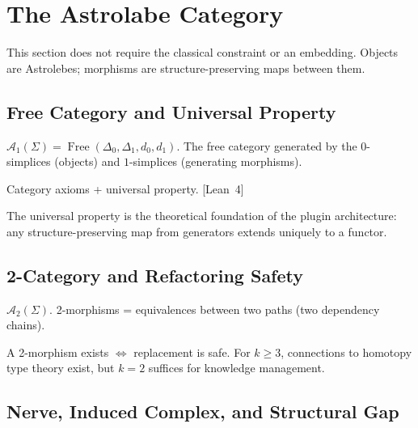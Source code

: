 \section{The Astrolabe Category}
\label{sec:category}

This section does not require the classical constraint or an embedding. Objects are Astrolebes; morphisms are structure-preserving maps between them.

\subsection{Free Category and Universal Property}

\begin{definition}
$\mathcal{A}_1(\Sigma) = \operatorname{Free}(\Delta_0, \Delta_1, d_0, d_1)$. The free category generated by the $0$-simplices (objects) and $1$-simplices (generating morphisms).
\end{definition}

\begin{theorem}
Category axioms + universal property. \textup{[Lean~4]}
\end{theorem}

\begin{remark}
The universal property is the theoretical foundation of the plugin architecture: any structure-preserving map from generators extends uniquely to a functor.
\end{remark}

\subsection{2-Category and Refactoring Safety}

\begin{definition}
$\mathcal{A}_2(\Sigma)$. 2-morphisms = equivalences between two paths (two dependency chains).
\end{definition}

\begin{remark}
A 2-morphism exists $\iff$ replacement is safe. For $k \geq 3$, connections to homotopy type theory exist, but $k = 2$ suffices for knowledge management.
\end{remark}

\subsection{Nerve, Induced Complex, and Structural Gap}

